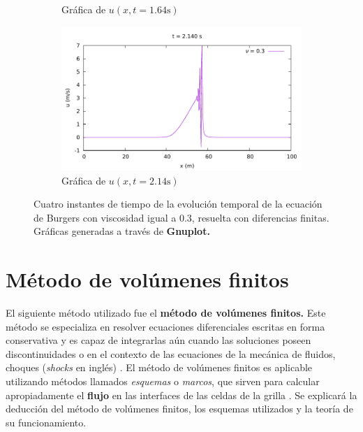 \documentclass[12pt]{article}
\begin{document}
\begin{figure}[ht]
\begin{subfigure}[b]{0.4\textwidth}
			\caption*{Gráfica de $u(x,t=1.64\unit{\second})$}
			\label{fig:vis0.3-3}
		\end{subfigure}
		\hfill
		\begin{subfigure}[b]{0.4\textwidth}
			\includegraphics[width=\textwidth]{../burg-vis1DDF/results/frames0.3/frame107.pdf}
			\caption*{Gráfica de $u(x,t=2.14\unit{\second})$}
			\label{fig:vis0.3-4}
		\end{subfigure}
		\caption{Cuatro instantes de tiempo de la evolución temporal de la ecuación de Burgers con viscosidad igual a $0.3$, resuelta con diferencias finitas. Gráficas generadas a través de \textbf{Gnuplot.}}
		\label{fig:instantes-nu0.3}
	\end{figure}

	\theoremstyle{definition}
	\newtheorem{definition}{Definición}[section]
	\clearpage
	\section{Método de volúmenes finitos}
	El siguiente método utilizado fue el \textbf{método de volúmenes finitos.} Este método se especializa en resolver ecuaciones diferenciales escritas en forma conservativa y es capaz de integrarlas aún cuando las soluciones poseen discontinuidades o  en el contexto de las ecuaciones de la mecánica de fluidos, choques (\textit{shocks} en inglés) \cite{LeVeque1998}. El método de volúmenes finitos es aplicable utilizando métodos llamados \textit{esquemas} o \textit{marcos}, que sirven para calcular apropiadamente el \textbf{flujo} en las interfaces de las celdas de la grilla \cite{LeVeque1998}. Se explicará la deducción del método de volúmenes finitos, los esquemas utilizados y la teoría de su funcionamiento.
	
\end{document}
